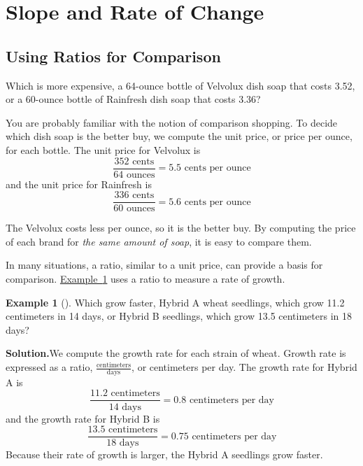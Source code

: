 \documentclass[10pt,]{book}
\theoremstyle{plain}
\theoremstyle{definition}
\theoremstyle{definition}
\newtheorem{example}[theorem]{Example}
\theoremstyle{definition}
\theoremstyle{definition}
\numberwithin{equation}{part}
\begin{document}
\typeout{************************************************}
\typeout{************************************************}
\section[{Slope and Rate of Change}]{Slope and Rate of Change}\label{slope-and-rate-of-change}
\typeout{************************************************}
\typeout{************************************************}
\subsection[{Using Ratios for Comparison}]{Using Ratios for Comparison}\label{subsection-20}
Which is more expensive, a 64-ounce bottle of Velvolux dish soap that costs \textdollar{}3.52, or a 60-ounce bottle of Rainfresh dish soap that costs \textdollar{}3.36?%
\par
You are probably familiar with the notion of comparison shopping. To decide which dish soap is the better buy, we compute the unit price, or price per ounce, for each bottle. The unit price for Velvolux is%
\begin{equation*}
\frac{352 \text{ cents}}{64 \text{ ounces}}= 5.5 \text{ cents per ounce}
\end{equation*}
and the unit price for Rainfresh is%
\begin{equation*}
\frac{336 \text{ cents}}{60 \text{ ounces}}= 5.6 \text{ cents per ounce}
\end{equation*}
%
\par
The Velvolux costs less per ounce, so it is the better buy. By computing the price of each brand for \emph{the same amount of soap}, it is easy to compare them.%
\par
In many situations, a ratio, similar to a unit price, can provide a basis for comparison. \hyperref[example-rate-of-growth]{Example~\ref{example-rate-of-growth}} uses a ratio to measure a rate of growth.%
\begin{example}[]\label{example-rate-of-growth}
Which grow faster, Hybrid A wheat seedlings, which grow 11.2 centimeters in 14 days, or Hybrid B seedlings, which grow 13.5 centimeters in 18 days?%
\par\medskip\noindent%
\textbf{Solution.}\quad We compute the growth rate for each strain of wheat. Growth rate is expressed as a ratio, \(\frac{\text{centimeters}}{\text{days}}\), or centimeters per day. The growth rate for Hybrid A is%
\begin{equation*}
\frac{11.2 \text{ centimeters}}{14 \text{ days}}= 0.8 \text{ centimeters per day}
\end{equation*}
and the growth rate for Hybrid B is%
\begin{equation*}
\frac{13.5 \text{ centimeters}}{18 \text{ days}}= 0.75 \text{ centimeters per day}
\end{equation*}
Because their rate of growth is larger, the Hybrid A seedlings grow faster.%
\end{example}
\end{document}
